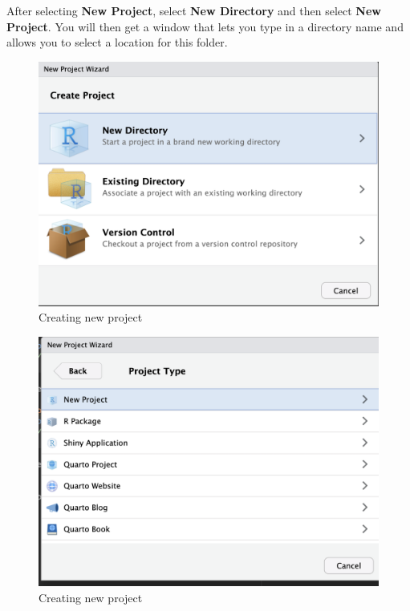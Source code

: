 \documentclass[
]{book}
\begin{document}
After selecting \textbf{New Project}, select \textbf{New Directory} and then select \textbf{New Project}. You will then get a window that lets you type in a directory name and allows you to select a location for this folder.

\begin{figure}
\includegraphics[width=16.31in]{images/2.11newproject1} \caption{Creating new project}\label{fig:unnamed-chunk-5-1}
\end{figure}
\begin{figure}
\includegraphics[width=16.33in]{images/2.12newproject2} \caption{Creating new project}\label{fig:unnamed-chunk-5-2}
\end{figure}
\end{document}
